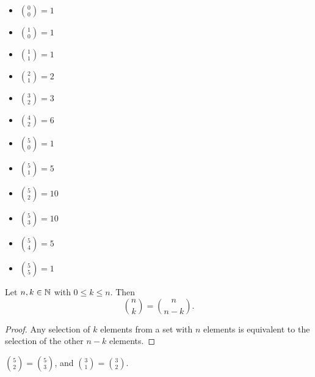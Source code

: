 \begin{exmp}\proofbreak
    \begin{multicols}{3}
        \begin{itemize}
            \item $\binom{0}{0} = 1$
            \item $\binom{1}{0} = 1$
            \item $\binom{1}{1} = 1$
            \item $\binom{2}{1} = 2$
        \end{itemize}

        \columnbreak

        \begin{itemize}
            \item $\binom{3}{2} = 3$
            \item $\binom{4}{2} = 6$
            \item $\binom{5}{0} = 1$
            \item $\binom{5}{1} = 5$
        \end{itemize}

        \columnbreak

        \begin{itemize}
            \item $\binom{5}{2} = 10$
            \item $\binom{5}{3} = 10$
            \item $\binom{5}{4} = 5$
            \item $\binom{5}{5} = 1$
        \end{itemize}
    \end{multicols}
\end{exmp}

\begin{prop}\label{binomial-complement}
    Let $n, k \in \mathbb{N}$ with $0 \leq k \leq n$. Then \[\binom{n}{k} = \binom{n}{n-k}.\]
\end{prop}

\begin{proof}
    Any selection of $k$ elements from a set with $n$ elements is equivalent to the selection of the other $n-k$ elements.
\end{proof}

\begin{exmp}
    $\binom{5}{2} = \binom{5}{3}$, and $\binom{3}{1} = \binom{3}{2}$.
\end{exmp}

